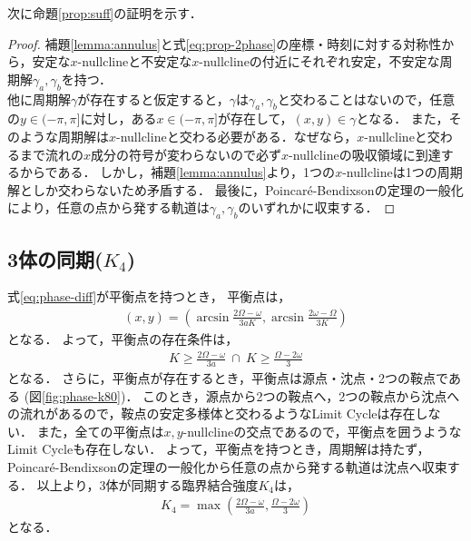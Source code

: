 \documentclass[../main]{subfiles}
\begin{document}
    次に命題\ref{prop:suff}の証明を示す．
    \begin{proof}
        補題\ref{lemma:annulus}と式\eqref{eq:prop-2phase}の座標・時刻に対する対称性から，安定な$x$-nullclineと不安定な$x$-nullclineの付近にそれぞれ安定，不安定な周期解$\gamma_a,\gamma_b$を持つ．\\
        他に周期解$\gamma$が存在すると仮定すると，$\gamma$は$\gamma_a,\gamma_b$と交わることはないので，任意の$y\in(-\pi,\pi]$に対し，ある$x\in(-\pi,\pi]$が存在して，$(x,y)\in\gamma$となる．
        また，そのような周期解は$x$-nullclineと交わる必要がある．なぜなら，$x$-nullclineと交わるまで流れの$x$成分の符号が変わらないので必ず$x$-nullclineの吸収領域に到達するからである．
        しかし，補題\ref{lemma:annulus}より，1つの$x$-nullclineは1つの周期解としか交わらないため矛盾する．
        最後に，Poincaré-Bendixsonの定理の一般化により，任意の点から発する軌道は$\gamma_a,\gamma_b$のいずれかに収束する．
    \end{proof}
\subsection{3体の同期($K_4$)}
式\eqref{eq:phase-diff}が平衡点を持つとき，
平衡点は，
\begin{align*}
    (x,y)=\left(\arcsin \frac{2\Omega-\omega}{3aK},\arcsin \frac{2\omega-\Omega}{3K}\right)
\end{align*}
となる．
よって，平衡点の存在条件は，
\begin{align*}
    K\geq \frac{2\Omega-\omega}{3a}\ \cap \ K\geq \frac{\Omega-2\omega}{3}
\end{align*}
となる．
さらに，平衡点が存在するとき，平衡点は源点・沈点・2つの鞍点である (図\ref{fig:phase-k80})．
このとき，源点から2つの鞍点へ，2つの鞍点から沈点への流れがあるので，鞍点の安定多様体と交わるようなLimit Cycleは存在しない．
また，全ての平衡点は$x,y$-nullclineの交点であるので，平衡点を囲うようなLimit Cycleも存在しない．
よって，平衡点を持つとき，周期解は持たず，Poincaré-Bendixsonの定理の一般化から任意の点から発する軌道は沈点へ収束する．
以上より，3体が同期する臨界結合強度$K_4$は，
\begin{align*}
    K_4=\max\left(\frac{2\Omega-\omega}{3a},\frac{\Omega-2\omega}{3}\right)
\end{align*}
となる．
\end{document}
